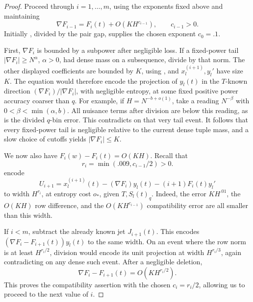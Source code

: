 \begin{proof}
Proceed through \(i=1,\ldots,m\), using the exponents fixed above and
maintaining
\begin{equation}\label{a04:row-compatibility}
 \nabla F_{i-1}=F_i(t)+O(KH^{c_{i-1}}),
 \qquad c_{i-1}>0.
\end{equation}
Initially , divided by the pair gap, supplies
the chosen exponent \(c_0=.1\).

First, \(\nabla F_i\) is bounded by a subpower after negligible loss.
If a fixed-power tail \(|\nabla F_i|\ge N^\alpha\), \(\alpha>0\), had
dense mass on a subsequence, divide  by that
norm.
The other displayed coefficients are bounded by \(K\), using
, and \(x_l^{(i+1)},y_l'\) have size \(K\).
The equation would therefore encode the projection of \(y_l(t)\)
in the \(T\)-known direction
\((\nabla F_i)/|\nabla F_i|\), with negligible entropy, at some fixed
positive power accuracy coarser than \(q\).
For example, if \(H=N^{-b+o(1)}\), take a reading
\(N^{-\beta}\) with \(0<\beta<\min(\alpha,b)\).
All nuisance terms after division are below this reading, as is the
divided \(q\)-bin error.
This contradicts  on that very tail event.
It follows that every fixed-power tail is negligible relative to
the current dense tuple mass, and a slow choice of cutoffs yields
\(|\nabla F_i|\le K\).

We now also have \(F_i(w)-F_i(t)=O(KH)\).
Recall that
\[
 r_i=\min(.009,c_{i-1}/2)>0.
\]
 encode
\begin{equation}\label{a04:next-jet}
 U_{i+1}
 =x_l^{(i+1)}(t)-(\nabla F_i)y_l(t)
                      -(i+1)F_i(t)y_l'
\end{equation}
to width \(H^{r_i}\), at entropy cost \(o_*\), given \(T,S_l(t)_q\).
Indeed, the error \(KH^{.01}\), the \(O(KH)\) row difference, and the
\(O(KH^{c_{i-1}})\) compatibility error are all smaller than this width.

If \(i<m\), subtract the already known jet \(J_{i+1}(t)\).
This encodes
\((\nabla F_i-F_{i+1}(t))y_l(t)\) to the same width.
On an event where the row norm is at least \(H^{r_i/2}\), division would
encode its unit projection at width \(H^{r_i/3}\), again contradicting
 on any dense such event.
After a negligible deletion,
\[
 \nabla F_i-F_{i+1}(t)=O(KH^{r_i/2}).
\]
This proves the compatibility assertion with the chosen
\(c_i=r_i/2\), allowing us to proceed to the next value of \(i\).


\end{proof}
